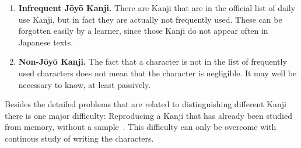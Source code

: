 \begin{enumerate}
  \item \textbf{Infrequent Jōyō Kanji.} There are Kanji that are in the official
        list of daily use Kanji, but in fact they are actually not frequently 
        used. These can be forgotten easily by a learner, since those Kanji do 
        not appear often in Japanese texts.

  \item \textbf{Non-Jōyō Kanji.} The fact that a character is not in the list 
        of frequently used characters does not mean that the character is 
        negligible. It may well be necessary to know, at least passively.
\end{enumerate}
Besides the detailed problems that are related to distinguishing different Kanji 
there is one major difficulty:
Reproducing a Kanji that has already been studied from memory, without a
sample~. This difficulty can only be overcome with 
continous study of writing the characters.

